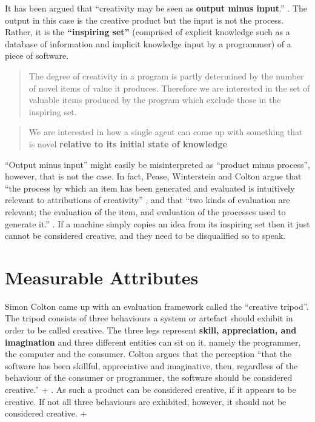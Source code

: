 It has been argued that ``creativity may be seen as \textbf{output minus input}.'' \citep[p.2, my emphasis]{Pease2001}. The output in this case is the creative product but the input is not the process. Rather, it is the \textbf{``inspiring set''} (comprised of explicit knowledge such as a database of information and implicit knowledge input by a programmer) of a piece of software.

\begin{quote}
  The degree of creativity in a program is partly determined by the number of novel items of value it produces. Therefore we are interested in the set of valuable items produced by the program which exclude those in the inspiring set. \citep[p.3]{Colton2001}
\end{quote}

\begin{quote}
  We are interested in how a single agent can come up with something that is novel \textbf{relative to its initial state of knowledge} \citep[p.72, his emphasis]{Ritchie2007}
\end{quote}

``Output minus input'' might easily be misinterpreted as ``product minus process'', however, that is not the case. In fact, Pease, Winterstein and Colton argue that ``the process by which an item has been generated and evaluated is intuitively relevant to attributions of creativity'' \citep[p.6]{Pease2001}, and that ``two kinds of evaluation are relevant; the evaluation of the item, and evaluation of the processes used to generate it.'' \citep[p.7]{Pease2001}. If a machine simply copies an idea from its inspiring set then it just cannot be considered creative, and they need to be disqualified so to speak.


\section{Measurable Attributes}

Simon Colton came up with an evaluation framework called the ``creative tripod''. The tripod consists of three behaviours a system or artefact should exhibit in order to be called creative. The three legs represent \textbf{skill, appreciation, and imagination} and three different entities can sit on it, namely the programmer, the computer and the consumer. Colton argues that the perception ``that the software has been skillful, appreciative and imaginative, then, regardless of the behaviour of the consumer or programmer, the software should be considered creative.'' \citep[p.5]{Colton2008a} + \citep[p.5]{Colton2008}. As such a product can be considered creative, if it appears to be creative. If not all three behaviours are exhibited, however, it should not be considered creative. \citep[p.5]{Colton2008a} + \citep[p.5]{Colton2008}

